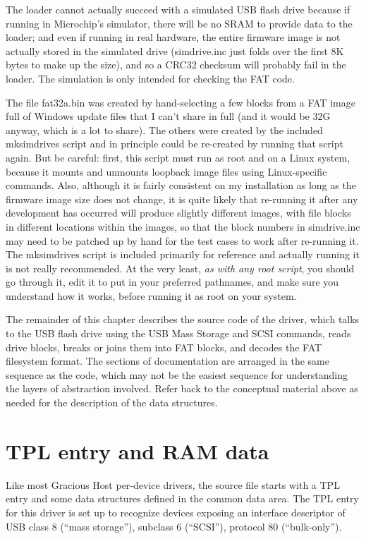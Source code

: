 The loader cannot actually succeed with a simulated USB flash drive because
if running in Microchip's simulator, there will be no SRAM to provide data
to the loader; and even if running in real hardware, the entire firmware
image is not actually stored in the simulated drive (simdrive.inc just
folds over the first 8K bytes to make up the size), and so a CRC32 checksum
will probably fail in the loader.  The simulation is only intended for
checking the FAT code.

The file fat32a.bin was created by hand-selecting a few blocks from a FAT
image full of Windows update files that I can't share in full (and it would
be 32G anyway, which is a lot to share).  The others were created by the
included mksimdrives script and in principle could be re-created by running
that script again.  But be careful: first, this script must run as root and
on a Linux system, because it mounts and unmounts loopback image files using
Linux-specific commands.  Also, although it is fairly consistent on my
installation as long as the firmware image size does not change, it is quite
likely that re-running it after any development has occurred will produce
slightly different images, with file blocks in different locations within
the images, so that the block numbers in simdrive.inc may need to be patched
up by hand for the test cases to work after re-running it.  The mksimdrives
script is included primarily for reference and actually running it is not
really recommended.  At the very least, \emph{as with any root script}, you
should go through it, edit it to put in your preferred pathnames, and make
sure you understand how it works, before running it as root on your system.

The remainder of this chapter describes the source code of the driver, which
talks to the USB flash drive using the USB Mass Storage and SCSI commands,
reads drive blocks, breaks or joins them into FAT blocks, and decodes the
FAT filesystem format.  The sections of documentation are arranged in the
same sequence as the code, which may not be the easiest sequence for
understanding the layers of abstraction involved.  Refer back to the
conceptual material above as needed for the description of the data
structures.

\section{TPL entry and RAM data}

Like most Gracious Host per-device drivers, the source file starts with a
TPL entry and some data structures defined in the common data area.  The TPL
entry for this driver is set up to recognize devices exposing an interface
descriptor of USB class 8 (``mass storage''), subclass 6 (``SCSI''),
protocol 80 (``bulk-only'').

